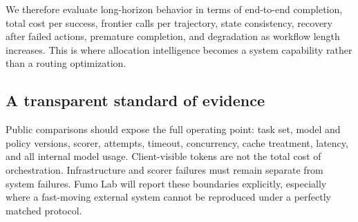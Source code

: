 We therefore evaluate long-horizon behavior in terms of end-to-end completion,
total cost per success, frontier calls per trajectory, state consistency,
recovery after failed actions, premature completion, and degradation as
workflow length increases. This is where allocation intelligence becomes a
system capability rather than a routing optimization.

\subsection{A transparent standard of evidence}

Public comparisons should expose the full operating point: task set, model and
policy versions, scorer, attempts, timeout, concurrency, cache treatment,
latency, and all internal model usage. Client-visible tokens are not the total
cost of orchestration. Infrastructure and scorer failures must remain separate
from system failures. Fumo Lab will report these boundaries explicitly,
especially where a fast-moving external system cannot be reproduced under a
perfectly matched protocol.
